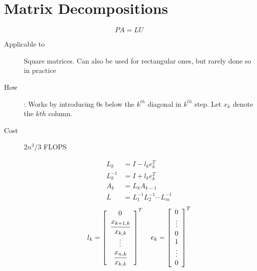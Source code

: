 \section{Matrix Decompositions}

\def\moo#1{\emph{#1}}
\begin{slide}[LU Decomposition]
   $$PA =LU$$
   \begin{description}
     \item [Applicable to] Square matrices. Can also be used for rectangular ones, but rarely done so in practice
   \item[How]: Works by introducing $0$s below the $k^{th}$ diagonal in $k^{th}$ step. Let $x_k$ denote the $k{th}$ column.
   \item[Cost] $2n^3/3$ FLOPS
	\begin{multicols}{2}
	\begin{align*}
	L_k &= I-l_ke_k^T
	\\
	L_k^{-1} &= I+l_ke_k^T
	\\
	A_k &= L_kA_{k-1}
	\\
	L &= L_1^{-1}L_2^{-1}\cdots L_m^{-1}
	\end{align*}
	$$l_k = \left[ 
	\begin{array}{c}
	0
	\\
	\cfrac{x_{k+1,k}}{ x_{k,k}} 
	\\
	\vdots 
	\\
	\cfrac{x_{n,k}}{x_{k,k}}
	\end{array}
	\right]^T	
	\quad
	e_k = \left[ 
	\begin{array}{c}
	0
	\\
	\vdots
	\\
	0
	\\
	1
	\\
	\vdots 
	\\
	0
	\end{array}
	\right]^T
	$$
\end{multicols}
   \end{description}
\end{slide}
